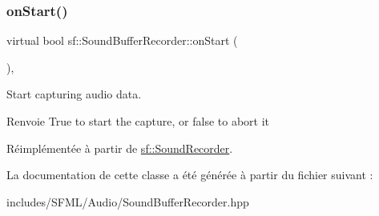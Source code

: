 \subsubsection{\texorpdfstring{on\+Start()}{onStart()}}
{\footnotesize\ttfamily virtual bool sf\+::\+Sound\+Buffer\+Recorder\+::on\+Start (\begin{DoxyParamCaption}{ }\end{DoxyParamCaption})\hspace{0.3cm}{\ttfamily [protected]}, {\ttfamily [virtual]}}



Start capturing audio data. 

\begin{DoxyReturn}{Renvoie}
True to start the capture, or false to abort it 
\end{DoxyReturn}


Réimplémentée à partir de \hyperlink{classsf_1_1SoundRecorder_a7af418fb036201d3f85745bef78ce77f}{sf\+::\+Sound\+Recorder}.



La documentation de cette classe a été générée à partir du fichier suivant \+:\begin{DoxyCompactItemize}
\item 
includes/\+S\+F\+M\+L/\+Audio/Sound\+Buffer\+Recorder.\+hpp\end{DoxyCompactItemize}

